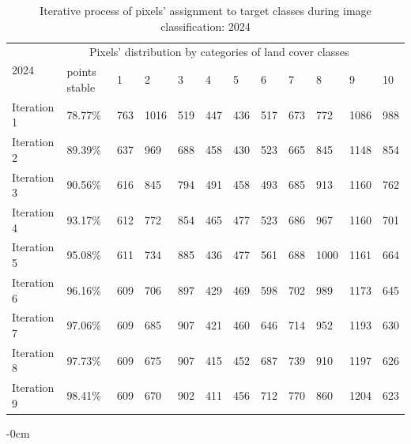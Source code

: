 \documentclass[jmse,article,submit,pdftex,moreauthors]{Definitions/mdpi}
\begin{document}
\begin{table}[H]
  \centering
  \begin{tabularx}{\textwidth}{p{1.4cm}p{1.8cm}p{0.7cm}p{0.6cm}p{0.6cm}p{0.6cm}p{0.6cm}p{0.6cm}p{0.6cm}p{0.6cm}p{0.6cm}p{0.6cm}}
  \toprule
  \multirow{2}{*}{2024} & \multicolumn{10}{c}{Pixels' distribution by categories of land cover classes} \\
    & points stable  & 1 & 2 &  3 & 4 & 5 & 6 & 7 & 8 & 9 & 10 \\
    \midrule
    Iteration 1 & 78.77\% & 763 &1016&519 &447 & 436 & 517 & 673 &772 & 1086 & 988 \\
    Iteration 2 & 89.39\% & 637 & 969 & 688 & 458 &430 &523 & 665 &845 &1148 & 854 \\
    Iteration 3 & 90.56\% & 616 & 845 & 794 & 491 &  458 & 493 & 685  & 913 & 1160 & 762 \\
    Iteration 4 & 93.17\% & 612 & 772 & 854 &465 &477 &523 & 686 &967 & 1160 &701 \\
    Iteration 5 & 95.08\% & 611 &  734 & 885 &  436 &  477 & 561 & 688 &  1000& 1161 &  664 \\
    Iteration 6 & 96.16\% & 609 &706 & 897 &429 &469 &598 &702 & 989 &1173 &645 \\
    Iteration 7 & 97.06\% & 609 & 685 & 907 &421& 460 & 646 &714 & 952 &1193 &630 \\
    Iteration 8 & 97.73\% & 609  &675  &907 &415 & 452  &687 &739  & 910  &1197  & 626 \\
    Iteration 9 & 98.41\% & 609& 670 & 902&411 &456 &712 & 770 & 860 &1204 &623 \\
\bottomrule
\end{tabularx}
  \caption{Iterative process of pixels' assignment to target classes during image classification: 2024}
  \label{tabB4}
\end{table}

\begin{adjustwidth}{-\extralength}{0cm}

\nocite{*}



\end{adjustwidth}
\end{document}
